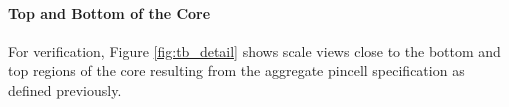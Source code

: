 \paragraph{Top and Bottom of the Core}

For verification, Figure \ref{fig:tb_detail} shows scale
views close to the bottom and top regions of the core resulting from the
aggregate pincell specification as defined previously.


